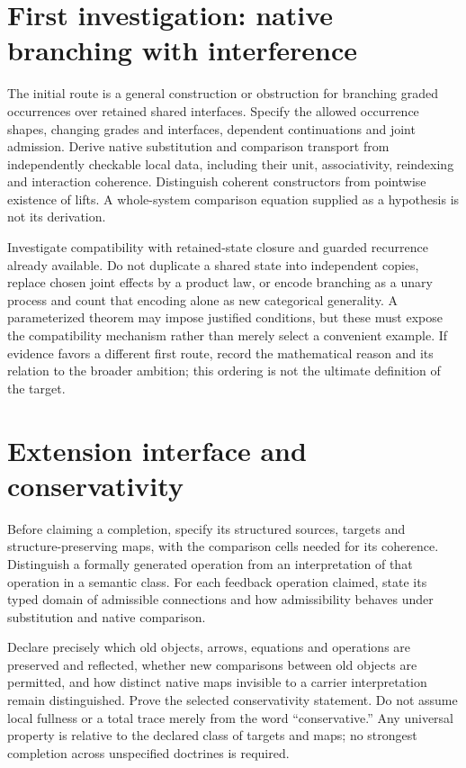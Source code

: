 \documentclass[11pt]{article}
\begin{document}
\section{First investigation: native branching with interference}
The initial route is a general construction or obstruction for branching graded occurrences over retained shared interfaces. Specify the allowed occurrence shapes, changing grades and interfaces, dependent continuations and joint admission. Derive native substitution and comparison transport from independently checkable local data, including their unit, associativity, reindexing and interaction coherence. Distinguish coherent constructors from pointwise existence of lifts. A whole-system comparison equation supplied as a hypothesis is not its derivation.

Investigate compatibility with retained-state closure and guarded recurrence already available. Do not duplicate a shared state into independent copies, replace chosen joint effects by a product law, or encode branching as a unary process and count that encoding alone as new categorical generality. A parameterized theorem may impose justified conditions, but these must expose the compatibility mechanism rather than merely select a convenient example. If evidence favors a different first route, record the mathematical reason and its relation to the broader ambition; this ordering is not the ultimate definition of the target.

\section{Extension interface and conservativity}
Before claiming a completion, specify its structured sources, targets and structure-preserving maps, with the comparison cells needed for its coherence. Distinguish a formally generated operation from an interpretation of that operation in a semantic class. For each feedback operation claimed, state its typed domain of admissible connections and how admissibility behaves under substitution and native comparison.

Declare precisely which old objects, arrows, equations and operations are preserved and reflected, whether new comparisons between old objects are permitted, and how distinct native maps invisible to a carrier interpretation remain distinguished. Prove the selected conservativity statement. Do not assume local fullness or a total trace merely from the word ``conservative.'' Any universal property is relative to the declared class of targets and maps; no strongest completion across unspecified doctrines is required.
\end{document}
